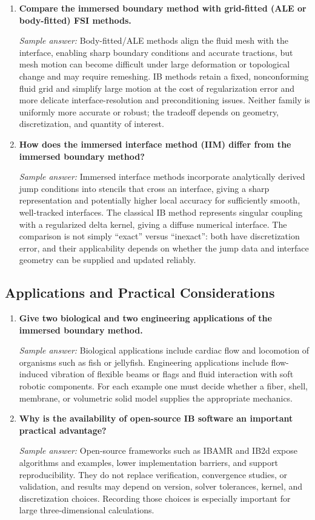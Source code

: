 \documentclass[12pt]{article}
\begin{document}
\begin{enumerate}[resume]
\item \textbf{Compare the immersed boundary method with grid-fitted (ALE or body-fitted) FSI methods.}

\textit{Sample answer:}
Body-fitted/ALE methods align the fluid mesh with the interface, enabling sharp
boundary conditions and accurate tractions, but mesh motion can become difficult
under large deformation or topological change and may require remeshing. IB
methods retain a fixed, nonconforming fluid grid and simplify large motion at the
cost of regularization error and more delicate interface-resolution and
preconditioning issues. Neither family is uniformly more accurate or robust;
the tradeoff depends on geometry, discretization, and quantity of interest.

\item \textbf{How does the immersed interface method (IIM) differ from the immersed boundary method?}

\textit{Sample answer:}
Immersed interface methods incorporate analytically derived jump conditions into
stencils that cross an interface, giving a sharp representation and potentially
higher local accuracy for sufficiently smooth, well-tracked interfaces. The
classical IB method represents singular coupling with a regularized delta kernel,
giving a diffuse numerical interface. The comparison is not simply ``exact''
versus ``inexact'': both have discretization error, and their applicability
depends on whether the jump data and interface geometry can be supplied and
updated reliably.
\end{enumerate}

\newpage
\subsection*{Applications and Practical Considerations}

\begin{enumerate}[resume]
\item \textbf{Give two biological and two engineering applications of the immersed boundary method.}

\textit{Sample answer:}
Biological applications include cardiac flow and locomotion of organisms such
as fish or jellyfish. Engineering applications include flow-induced vibration
of flexible beams or flags and fluid interaction with soft robotic components.
For each example one must decide whether a fiber, shell, membrane, or volumetric
solid model supplies the appropriate mechanics.

\item \textbf{Why is the availability of open-source IB software an important practical advantage?}

\textit{Sample answer:}
Open-source frameworks such as IBAMR and IB2d expose algorithms and examples,
lower implementation barriers, and support reproducibility. They do not replace
verification, convergence studies, or validation, and results may depend on
version, solver tolerances, kernel, and discretization choices. Recording those
choices is especially important for large three-dimensional calculations.
\end{enumerate}
\end{document}
